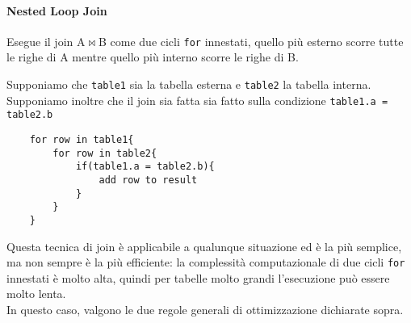 \documentclass[12pt,a4paper]{book}
\begin{document}
	\paragraph{Nested Loop Join} Esegue il join A$\Join$B come due cicli \texttt{for} innestati, quello più esterno scorre tutte le righe di A mentre quello più interno scorre le righe di B.\vspace{10px}
	\begin{tcolorbox}[enhanced jigsaw, breakable, title=Pseudocodice, title filled]
	Supponiamo che \texttt{table1} sia la tabella esterna e \texttt{table2} la tabella interna.\\
	Supponiamo inoltre che il join sia fatta sia fatto sulla condizione \texttt{table1.a = table2.b}
	\begin{lstlisting}
	for row in table1{
		for row in table2{
			if(table1.a = table2.b){
				add row to result
			}
		}
	}
	\end{lstlisting}
	\end{tcolorbox}
	Questa tecnica di join è applicabile a qualunque situazione ed è la più semplice, ma non sempre è la più efficiente: la complessità computazionale di due cicli \texttt{for} innestati è molto alta, quindi per tabelle molto grandi l'esecuzione può essere molto lenta.\\
	In questo caso, valgono le due regole generali di ottimizzazione dichiarate sopra.
\end{document}
